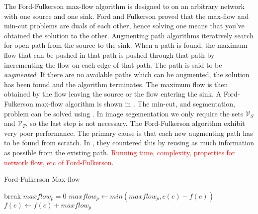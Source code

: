 The Ford-Fulkerson max-flow algorithm \citep{Ford1956} is designed to on an arbitrary network with one source and one sink. Ford and Fulkerson proved that the max-flow and min-cut problems are duals of each other, hence solving one means that you've obtained the solution to the other. Augmenting path algorithms iteratively search for open path from the source to the sink. When a path is found, the maximum flow that can be pushed in that path is pushed through that path by incrementing the flow on each edge of that path. The path is said to be \textit{augmented}. If there are no available paths which can be augmented, the solution has been found and the algorithm terminates. The maximum flow is then obtained by the flow leaving the source or the flow entering the sink. A Ford-Fulkerson max-flow algorithm is shown in . The min-cut, and segmentation, problem can be solved using . In image segementation we only require the sets $\mathcal{V}_S$ and $\mathcal{V}_T$, so the last step is not necessary. The Ford-Fulkerson algorithm exhibit very poor performance. The primary cause is that each new augmenting path has to be found from scratch. In \citep{Boykvo2001_3}, they countered this by reusing as much information as possible from the existing path.
\textcolor{red}{Running time, complexity, properties for network flow, etc of Ford-Fulkerson}.

\begin{algorithm}[!t]
	\caption{Ford-Fulkerson Max-flow}\label{alg:fordfulkerson}
	\begin{algorithmic}[1]
					\State break
				\EndIf
				\newline
				\State $maxflow_p = 0$
					\State $maxflow_p \gets min(maxflow_p,c(e)-f(e))$
				\EndFor
				\newline
					\State $f(e) \gets f(e) + maxflow_p$
				\EndFor
			\EndWhile\label{fordfulkersonwhile}
		\EndProcedure
	\end{algorithmic}
\end{algorithm}

